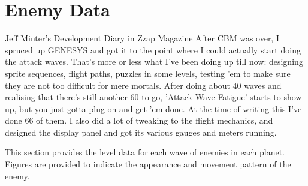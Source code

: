 \chapter{Enemy Data}

\begin{q}{Jeff Minter's Development Diary in Zzap Magazine\cite{devdiary}}
After CBM was over, I spruced up GENESYS and got it to the point where I could actually start doing the attack waves. That's more or less what I've been doing up till now: designing sprite sequences, flight paths, puzzles in some levels, testing 'em to make sure they are not too difficult for mere mortals. After doing about 40 waves and realising that there's still another 60 to go, 'Attack Wave Fatigue' starts to show up, but you just gotta plug on and get 'em done. At the time of writing this I've done 66 of them. I also did a lot of tweaking to the flight mechanics, and designed the display panel and got its various gauges and meters running.
\end{q}

This section provides the level data for each wave of enemies in each
planet. Figures are provided to indicate the appearance and movement
pattern of the enemy.


